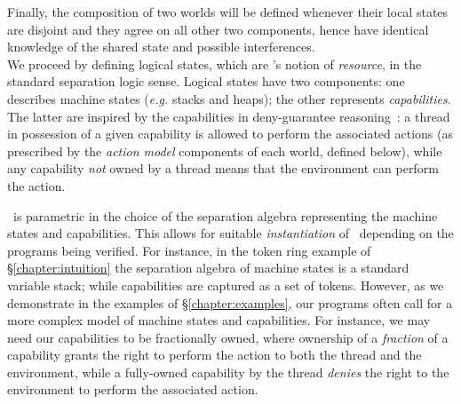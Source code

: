 
Finally, the composition of two worlds will be defined whenever their local states are disjoint and they agree on all other two components, hence have identical knowledge of the shared state and possible interferences.\\

We proceed by defining logical states, which are \colosl's notion of \emph{resource}, in the standard separation logic sense. Logical states have two components: one describes machine states (\textit{e.g.} stacks and heaps); the other
represents \emph{capabilities}. The latter are inspired by the capabilities in deny-guarantee reasoning~\cite{dg}: a thread in possession of a given capability is allowed to perform the associated actions (as prescribed by the \emph{action model} components of each world, defined below), while any capability \emph{not} owned by a thread means that the environment can perform the action.

\colosl\ is parametric in the choice of the separation algebra representing the machine states and capabilities. This allows for suitable \emph{instantiation} of \colosl\ depending on the programs being verified. For instance, in the token ring example of \S\ref{chapter:intuition} the separation algebra of machine states is a standard variable stack; while capabilities are captured as a set of tokens. However, as we demonstrate in the examples of \S\ref{chapter:examples}, our programs often call for a more complex model of machine states and capabilities. For instance, we may need our capabilities to be fractionally owned, where ownership of a \emph{fraction} of a capability grants the right to perform the action to both the thread and the environment, while a fully-owned capability by the thread \emph{denies} the right to the environment to perform the associated action. 


